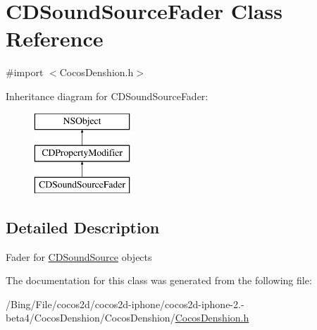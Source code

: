 \hypertarget{interface_c_d_sound_source_fader}{\section{C\-D\-Sound\-Source\-Fader Class Reference}
\label{interface_c_d_sound_source_fader}
}


{\ttfamily \#import $<$Cocos\-Denshion.\-h$>$}

Inheritance diagram for C\-D\-Sound\-Source\-Fader\-:\begin{figure}[H]
\begin{center}
\leavevmode
\includegraphics[height=3.000000cm]{interface_c_d_sound_source_fader}
\end{center}
\end{figure}


\subsection{Detailed Description}
Fader for \hyperlink{interface_c_d_sound_source}{C\-D\-Sound\-Source} objects 

The documentation for this class was generated from the following file\-:\begin{DoxyCompactItemize}
\item 
/\-Bing/\-File/cocos2d/cocos2d-\/iphone/cocos2d-\/iphone-\/2.-\/beta4/\-Cocos\-Denshion/\-Cocos\-Denshion/\hyperlink{_cocos_denshion_8h}{Cocos\-Denshion.\-h}\end{DoxyCompactItemize}
